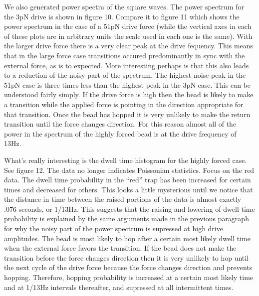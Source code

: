 \documentclass{report}
\begin{document}
We also generated power spectra of the square waves. The power spectrum for the 3pN drive is shown in figure 10. Compare it to figure 11 which shows the power spectrum in the case of a 51pN drive force (while the vertical axes in each of these plots are in arbitrary units the scale used in each one is the same). With the larger drive force there is a very clear peak at the drive fequency. This means that in the large force case transitions occured predominantly in sync with the external force, as is to expected. More interesting perhaps is that this also leads to a reduction of the noisy part of the spectrum. The highest noise peak in the 51pN case is three times less than the highest peak in the 3pN case. This can be understood fairly simply. If the drive force is high then the bead is likely to make a transition while the applied force is pointing in the direction appropriate for that transition. Once the bead has hopped it is very unlikely to make the return transition until the force changes direction. For this reason almost all of the power in the spectrum of the highly forced bead is at the drive frequency of 13Hz.

What's really interesting is the dwell time histogram for the highly forced case. See figure 12. The data no longer indicates Poissonian statistics. Focus on the red data. The dwell time probability in the ``red'' trap has been increased for certain times and decreased for others. This looks a little mysterious until we notice that the distance in time between the raised portions of the data is almost exactly $.076$ seconds, or 1/13Hz. This suggests that the  raising and lowering of dwell time probability is explained by the same arguments made in the previous paragraph for why the noisy part of the power spectrum is supressed at high drive amplitudes. The bead is most likely to hop after a certain most likely dwell time when the external force favors the transition. If the bead does not make the transition before the force changes direction then it is very unlikely to hop until the next cycle of the drive force because the force changes direction and prevents hopping. Therefore, hopping probability is increased at a certain most likely time and at 1/13Hz intervals thereafter, and supressed at all intermittent times.
\end{document}
